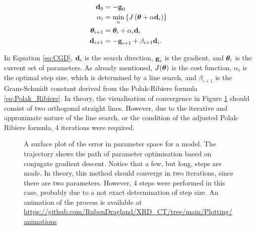 \begin{align}\label{eq:CGD}
    \begin{split}
        \bm{\mathrm{d}}_{0}        & = - \bm{\mathrm{g}}_{0}                                                    \\
        \alpha_{i}        & = \min_{\alpha} \left\{  J\left(\mathrm{\boldsymbol{\theta}} + \alpha \bm{\mathrm{d}}_{i} \right) \right\} \\
        \mathrm{\boldsymbol{\theta}}_{i+1} & = \mathrm{\boldsymbol{\theta}}_{i} + \alpha_{i} \bm{\mathrm{d}}_{i}                         \\
        \bm{\mathrm{d}}_{i+1}      & = -\bm{\mathrm{g}}_{i+1} + \beta_{i+1} \bm{\mathrm{d}}_{i}.                          \\
    \end{split}
\end{align}

In Equation \eqref{eq:CGD}, $\bm{\mathrm{d}}_{i}$ is the search direction, $\bm{\mathrm{g}}_{i}$ is the gradient, and $\mathrm{\boldsymbol{\theta}}_{i}$ is the current set of parameters.
As already mentioned, $J(\mathrm{\boldsymbol{\theta}})$ is the cost function, $\alpha_{i}$ is the optimal step size, which is determined by a line search, and $\beta_{i+1}$ is the Gram-Schmidt constant derived from the Polak-Ribiere formula \eqref{eq:Polak_Ribiere}.
In theory, the visualisation of convergence in Figure \ref{fig:CGD_surface} should consist of two orthogonal straight lines.
However, due to the iterative and approximate nature of the line search, or the condition of the adjusted Polak-Ribiere formula, \num{4} iterations were required.

\begin{figure}[h!]
    \centering
    
    \caption[Trajectory of Conjugate Gradient Descent]{A surface plot of the error in parameter space for a model.
        The trajectory shows the path of parameter optimisation based on conjugate gradient descent.
        Notice that a few, but long, steps are made.
        In theory, this method should converge in two iterations, since there are two parameters.
        However, \num{4} steps were performed in this case, probably due to a not exact determination of step size.
        An animation of the process is available at \url{https://github.com/RubenDragland/XRD_CT/tree/main/Plotting/animations}
    }
    \label{fig:CGD_surface}
\end{figure}

